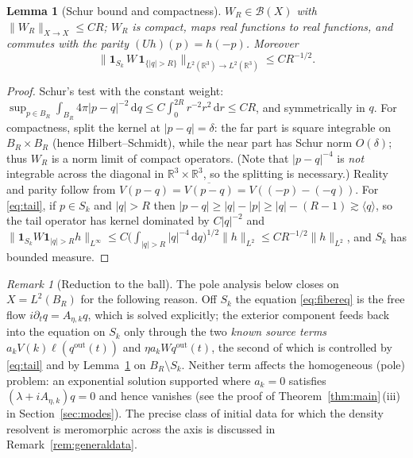 \documentclass[11pt,a4paper]{amsart}
\newtheorem{lemma}[theorem]{Lemma}
\theoremstyle{definition}
\theoremstyle{remark}
\newtheorem{remark}[theorem]{Remark}
\newcommand{\R}{\mathbb{R}}
\newcommand{\dd}{\,\mathrm{d}}
\newcommand{\ellf}{\ell}
\begin{document}
\begin{lemma}[Schur bound and compactness]\label{lem:WR}
$W_R\in\mathcal B(X)$ with $\|W_R\|_{X\to X}\le CR$; $W_R$ is compact, maps real functions to real functions, and commutes with the parity $(Uh)(p)=h(-p)$. Moreover
\begin{equation}\label{eq:tail}
\bigl\|\mathbf 1_{S_k}\,W\,\mathbf 1_{\{|q|>R\}}\bigr\|_{L^2(\R^3)\to L^2(\R^3)}\le CR^{-1/2}.
\end{equation}
\end{lemma}

\begin{proof}
Schur's test with the constant weight: $\sup_{p\in B_R}\int_{B_R}4\pi|p-q|^{-2}\dd q\le C\int_0^{2R}r^{-2}r^2\dd r\le CR$, and symmetrically in $q$. For compactness, split the kernel at $|p-q|=\delta$: the far part is square integrable on $B_R\times B_R$ (hence Hilbert--Schmidt), while the near part has Schur norm $O(\delta)$; thus $W_R$ is a norm limit of compact operators. (Note that $|p-q|^{-4}$ is \emph{not} integrable across the diagonal in $\R^3\times\R^3$, so the splitting is necessary.) Reality and parity follow from $V(p-q)=\overline{V(p-q)}=V((-p)-(-q))$. For \eqref{eq:tail}, if $p\in S_k$ and $|q|>R$ then $|p-q|\ge|q|-|p|\ge|q|-(R-1)\gtrsim\langle q\rangle$, so the tail operator has kernel dominated by $C|q|^{-2}$ and
$\|\mathbf 1_{S_k}W\mathbf 1_{|q|>R}h\|_{L^\infty}\le C\bigl(\int_{|q|>R}|q|^{-4}\dd q\bigr)^{1/2}\|h\|_{L^2}\le CR^{-1/2}\|h\|_{L^2}$, and $S_k$ has bounded measure.
\end{proof}

\begin{remark}[Reduction to the ball]\label{rem:reduction}
The pole analysis below closes on $X=L^2(B_R)$ for the following reason. Off $S_k$ the equation \eqref{eq:fibereq} is the free flow $i\partial_tq=A_{\eta,k}q$, which is solved explicitly; the exterior component feeds back into the equation on $S_k$ only through the two \emph{known source terms} $a_kV(k)\ellf(q^{\mathrm{out}}(t))$ and $\eta a_kWq^{\mathrm{out}}(t)$, the second of which is controlled by \eqref{eq:tail} and by Lemma~\ref{lem:WR} on $B_R\setminus S_k$. Neither term affects the homogeneous (pole) problem: an exponential solution supported where $a_k=0$ satisfies $(\lambda+iA_{\eta,k})q=0$ and hence vanishes (see the proof of Theorem~\ref{thm:main}\,(iii) in Section~\ref{sec:modes}). The precise class of initial data for which the density resolvent is meromorphic across the axis is discussed in Remark~\ref{rem:generaldata}.
\end{remark}
\end{document}
